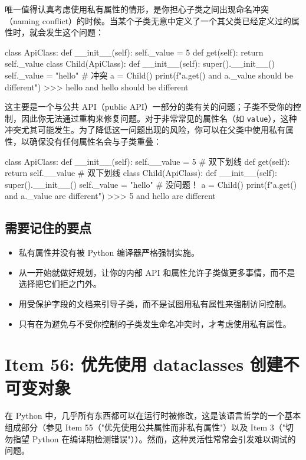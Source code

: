 唯一值得认真考虑使用私有属性的情形，是你担心子类之间出现命名冲突（naming conflict）的时候。当某个子类无意中定义了一个其父类已经定义过的属性时，就会发生这个问题：

\begin{codebox}[python]
class ApiClass:
    def __init__(self):
        self._value = 5
    def get(self):
        return self._value
class Child(ApiClass):
    def __init__(self):
        super().__init__()
        self._value = "hello"  # 冲突
a = Child()
print(f"{a.get()} and {a._value} should be different")
>>>
hello and hello should be different
\end{codebox}

这主要是一个与公共 API（public API）一部分的类有关的问题；子类不受你的控制，因此你无法通过重构来修复问题。对于非常常见的属性名（如 \texttt{value}），这种冲突尤其可能发生。为了降低这一问题出现的风险，你可以在父类中使用私有属性，以确保没有任何属性名会与子类重叠：

\begin{codebox}[python]
class ApiClass:
    def __init__(self):
        self.__value = 5       # 双下划线
    def get(self):
        return self.__value    # 双下划线
class Child(ApiClass):
    def __init__(self):
        super().__init__()
        self._value = "hello"  # 没问题！
a = Child()
print(f"{a.get()} and {a._value} are different")
>>>
5 and hello are different
\end{codebox}

\subsection{需要记住的要点}

\begin{itemize}
\item 私有属性并没有被 Python 编译器严格强制实施。
\item 从一开始就做好规划，让你的内部 API 和属性允许子类做更多事情，而不是选择把它们拒之门外。
\item 用受保护字段的文档来引导子类，而不是试图用私有属性来强制访问控制。
\item 只有在为避免与不受你控制的子类发生命名冲突时，才考虑使用私有属性。
\end{itemize}

\section{Item 56: 优先使用 dataclasses 创建不可变对象}

在 Python 中，几乎所有东西都可以在运行时被修改，这是该语言哲学的一个基本组成部分（参见 Item 55（"优先使用公共属性而非私有属性"）以及 Item 3（"切勿指望 Python 在编译期检测错误"））。然而，这种灵活性常常会引发难以调试的问题。


